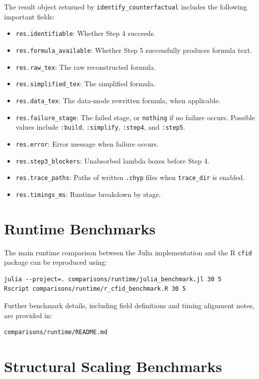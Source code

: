 \documentclass[a4paper]{report}
\begin{document}
The result object returned by \texttt{identify\_counterfactual} includes the following important fields:

\begin{itemize}
    \item \texttt{res.identifiable}: Whether Step 4 succeeds.
    \item \texttt{res.formula\_available}: Whether Step 5 successfully produces formula text.
    \item \texttt{res.raw\_tex}: The raw reconstructed formula.
    \item \texttt{res.simplified\_tex}: The simplified formula.
    \item \texttt{res.data\_tex}: The data-mode rewritten formula, when applicable.
    \item \texttt{res.failure\_stage}: The failed stage, or \texttt{nothing} if no failure occurs. Possible values include \texttt{:build}, \texttt{:simplify}, \texttt{:step4}, and \texttt{:step5}.
    \item \texttt{res.error}: Error message when failure occurs.
    \item \texttt{res.step3\_blockers}: Unabsorbed lambda boxes before Step 4.
    \item \texttt{res.trace\_paths}: Paths of written \texttt{.chyp} files when \texttt{trace\_dir} is enabled.
    \item \texttt{res.timings\_ms}: Runtime breakdown by stage.
\end{itemize}

\section{Runtime Benchmarks}

The main runtime comparison between the Julia implementation and the R \texttt{cfid} package can be reproduced using:

\begin{verbatim}
julia --project=. comparisons/runtime/julia_benchmark.jl 30 5
Rscript comparisons/runtime/r_cfid_benchmark.R 30 5
\end{verbatim}

Further benchmark details, including field definitions and timing alignment notes, are provided in:

\begin{verbatim}
comparisons/runtime/README.md
\end{verbatim}

\section{Structural Scaling Benchmarks}
\end{document}
